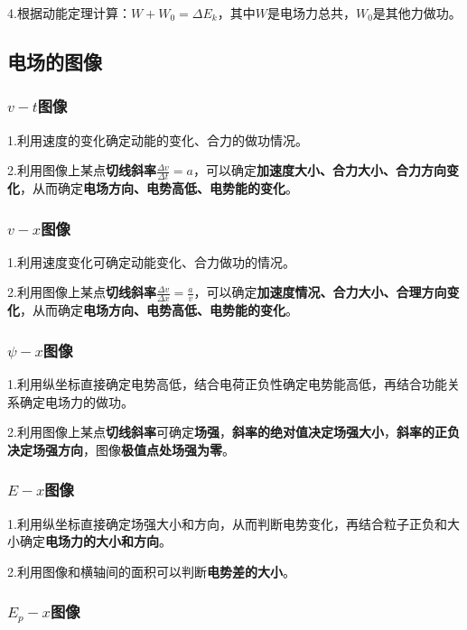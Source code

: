 \documentclass{ctexart}
\begin{document}
4.根据动能定理计算：$W+W_{0}=\Delta E_{k}$，其中$W$是电场力总共，$W_0$是其他力做功。

\subsection{电场的图像}

\subsubsection{$v-t$图像}

1.利用速度的变化确定动能的变化、合力的做功情况。

2.利用图像上某点\textbf{切线斜率}$\frac{\Delta v}{\Delta t}=a$，可以确定\textbf{加速度大小、合力大小、合力方向变化}，从而确定\textbf{电场方向、电势高低、电势能的变化}。

\subsubsection{$v-x$图像}

1.利用速度变化可确定动能变化、合力做功的情况。

2.利用图像上某点\textbf{切线斜率}$\frac{\Delta v}{\Delta x}=\frac{a}{v}$，可以确定\textbf{加速度情况、合力大小、合理方向变化}，从而确定\textbf{电场方向、电势高低、电势能的变化}。

\subsubsection{$\psi-x$图像}

1.利用纵坐标直接确定电势高低，结合电荷正负性确定电势能高低，再结合功能关系确定电场力的做功。

2.利用图像上某点\textbf{切线斜率}可确定\textbf{场强}，\textbf{斜率的绝对值决定场强大小}，\textbf{斜率的正负决定场强方向}，图像\textbf{极值点处场强为零}。

\subsubsection{$E-x$图像}

1.利用纵坐标直接确定场强大小和方向，从而判断电势变化，再结合粒子正负和大小确定\textbf{电场力的大小和方向}。

2.利用图像和横轴间的面积可以判断\textbf{电势差的大小}。

\subsubsection{$E_{p}-x$图像}
\end{document}
